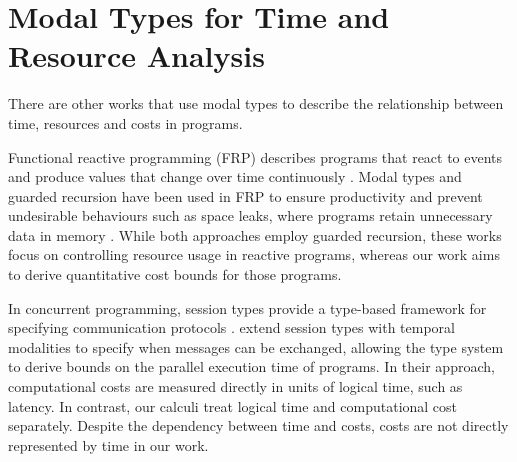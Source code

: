 \section{Modal Types for Time and Resource Analysis}
\label{sec:rw-temporal}
There are other works that use modal types to describe the
relationship between time, resources and costs in programs.

Functional reactive programming (FRP) describes programs that react to events and produce values that change over time continuously \citep{elliottH97}. 
Modal types and guarded recursion have been used in FRP to ensure productivity and prevent undesirable behaviours such as space leaks, where programs retain unnecessary data in memory \citep{krishnaswamiBH12,bahrSimplyRaTTFitchstyle2019a}. 
While both approaches employ guarded recursion, these works focus on controlling resource usage in reactive programs, whereas our work aims to derive quantitative cost bounds for those programs.

In concurrent programming, session types provide a type-based framework for specifying communication protocols \citep{HondaVK98}. 
\cite{dasParallelComplexityAnalysis2018} extend session types with temporal modalities to specify when messages can be exchanged, 
allowing the type system to derive bounds on the parallel execution time of programs. 
In their approach, computational costs are measured directly in units of logical time, such as latency.
In contrast, our calculi treat logical time and computational cost separately. Despite the dependency between time and costs, costs are not directly represented by time in our work.

